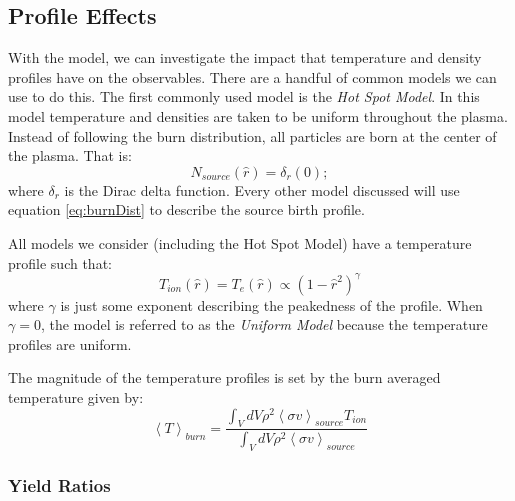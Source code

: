 \subsection{Profile Effects}

	With the model, we can investigate the impact that temperature and density profiles have on the observables. There are a handful of common models we can use to do this. The first commonly used model is the \emph{Hot Spot Model}. In this model temperature and densities are taken to be uniform throughout the plasma. Instead of following the burn distribution, all particles are born at the center of the plasma. That is:
	\begin{equation}
		N_{source}(\hat{r}) = \delta_r(0);
	\end{equation}
	where $\delta_r$ is the Dirac delta function. Every other model discussed will use equation \ref{eq:burnDist} to describe the source birth profile. 
	
	All models we consider (including the Hot Spot Model) have a temperature profile such that:
	\begin{equation}
		T_{ion}(\hat{r})=T_{e}(\hat{r}) \propto \left(1 - \hat{r}^2\right)^\gamma
		\label{eq:tempProfile}
	\end{equation}
	where $\gamma$ is just some exponent describing the peakedness of the profile. When $\gamma=0$, the model is referred to as the \emph{Uniform Model} because the temperature profiles are uniform. 
	
	The magnitude of the temperature profiles is set by the burn averaged temperature given by:
	\begin{equation}
		\left<T\right>_{burn} = \frac{\int_{V} dV \rho^2 \left<\sigma v\right>_{source} T_{ion}}{\int_{V} dV \rho^2 \left<\sigma v\right>_{source}}
	\end{equation}


	\subsubsection{Yield Ratios}
	
